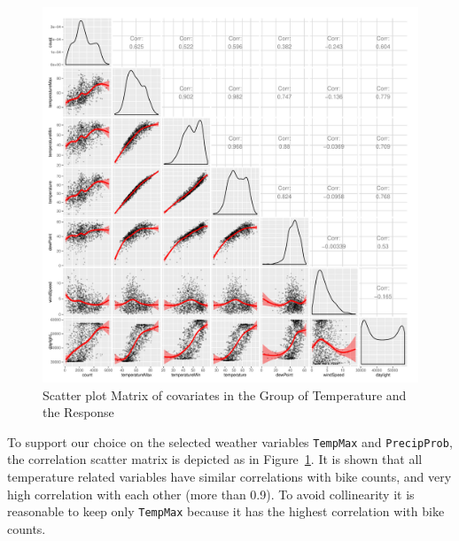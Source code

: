 \documentclass [11pt, proquest] {uwthesis}[2015/03/03]
\begin{document}
\begin{figure}
  \includegraphics[width=1\textwidth]{figures/matrix2}
  \caption{Scatter plot Matrix of covariates in the Group of Temperature and the Response}
  \label{fig:temp_corr}
\end{figure}

To support our choice on the selected weather variables \texttt{TempMax} and \texttt{PrecipProb}, the correlation scatter matrix is depicted as in Figure~\ref{fig:temp_corr}. It is shown that all temperature related variables have similar correlations with bike counts, and very high correlation with each other (more than 0.9). To avoid collinearity it is reasonable to keep only \texttt{TempMax} because it has the highest correlation with bike counts.  
\end{document}
